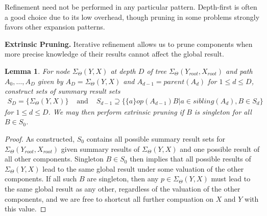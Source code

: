 \documentclass{article}
\newtheorem{lemma}{Lemma}
\newcommand{\GNP}[1][\psi]{{#1}_{\Theta}}
\begin{document}
Refinement need not be performed in any particular pattern.
Depth-first is often a good choice due to its low overhead, though
pruning in some problems strongly favors other expansion patterns.


{\bf Extrinsic Pruning.}  Iterative refinement allows us to prune
components when more precise knowledge of their results cannot affect
the global result.
\begin{lemma}
  For node $\GNP[\Sigma](Y,X)$ at depth $D$ of tree
  $\GNP[\Sigma](Y_{root},X_{root})$ and path $A_0,\ldots,A_D$ given by
  $A_D = \GNP[\Sigma](Y,X)$ and $A_{d-1} = parent(A_{d})$ for $1 \leq
  d \leq D$, construct sets of summary result sets
  \[ \begin{array}{rcl}
    S_D = \{\GNP[\Sigma](Y,X)\} & \mbox{ and } & S_{d-1} \supseteq \{\{a\} \mathbin{op(A_{d-1})} B | a \in sibling(A_d), B \in S_d\}
  \end{array} \]
  for $1 \leq d \leq D$.  We may then perform {\em extrinsic pruning}
  if $B$ is singleton for all $B \in S_0$.
\end{lemma}
\begin{proof}
  As constructed, $S_0$ contains all possible summary result sets for
  $\GNP[\Sigma](Y_{root},X_{root})$ given summary results of
  $\GNP[\Sigma](Y,X)$ and one possible result of all other components.
  Singleton $B \in S_0$ then implies that all possible results of
  $\GNP[\Sigma](Y,X)$ lead to the same global result under some
  valuation of the other components.  If all such $B$ are singleton,
  then any $p \in \GNP[\Sigma](Y,X)$ must lead to the same global
  result as any other, regardless of the valuation of the other
  components, and we are free to shortcut all further compuation on
  $X$ and $Y$ with this value.
\end{proof}
\end{document}
